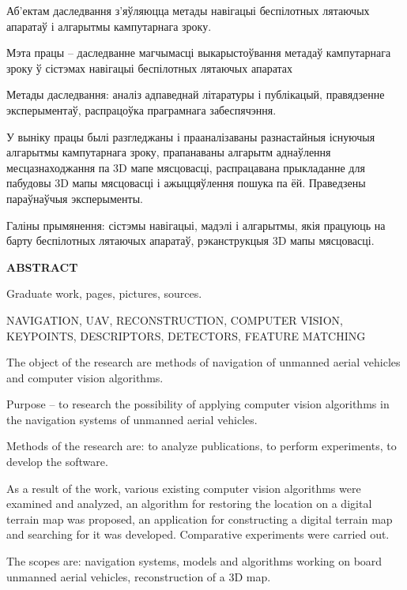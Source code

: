 Аб'ектам даследвання з'яўляюцца метады навігацыі беспілотных лятаючых апаратаў і алгарытмы кампутарнага зроку.

\vspace{1em}

Мэта працы -- даследванне магчымасці выкарыстоўвання метадаў кампутарнага зроку ў сістэмах навігацыі беспілотных лятаючых апаратах

\vspace{1em}

Метады даследвання: аналіз адпаведнай літаратуры і публікацый, правядзенне эксперыментаў, распрацоўка праграмнага забеспячэння.

\vspace{1em}

У выніку працы былі разгледжаны і прааналізаваны разнастайныя існуючыя алгарытмы кампутарнага зроку, прапанаваны алгарытм аднаўлення месцазнаходжання па 3D мапе мясцовасці, распрацавана прыкладанне для пабудовы 3D мапы мясцовасці і ажыццяўлення пошука па ёй. Праведзены параўнаўчыя эксперыменты.

\vspace{1em}


Галіны прымянення: сістэмы навігацыі, мадэлі і алгарытмы, якія працуюць на барту беспілотных лятаючых апаратаў, рэканструкцыя 3D мапы мясцовасці.
\newpage



\begin{center}
     \large\bfseries{ABSTRACT}
\end{center}

Graduate work, \pages pages, \figures pictures, \sources sources.

\begin{justify}
  \large{NAVIGATION, UAV, RECONSTRUCTION, COMPUTER VISION, KEYPOINTS, DESCRIPTORS, DETECTORS, FEATURE MATCHING}
\end{justify}

The object of the research are methods of navigation of unmanned aerial vehicles and computer vision algorithms.

\vspace{1em}


Purpose -- to research the possibility of applying computer vision algorithms in the navigation systems of unmanned aerial vehicles.

\vspace{1em}

Methods of the research are: to analyze publications, to perform experiments, to develop the software.

\vspace{1em}

As a result of the work, various existing computer vision algorithms were examined and analyzed, an algorithm for restoring the location on a digital terrain map was proposed, an application for constructing a digital terrain map and searching for it was developed. Comparative experiments were carried out.

\vspace{1em}


The scopes are: navigation systems, models and algorithms working on board unmanned aerial vehicles, reconstruction of a 3D map.
\newpage